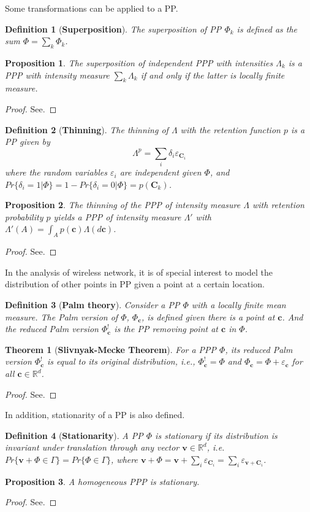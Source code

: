 \documentclass[a4paper,twocolumn]{IEEEtran}
\newtheorem{definition}{\textbf{Definition}}
\newtheorem{proposition}{\textbf{Proposition}}
\newtheorem{theorem}{\textbf{Theorem}}
\begin{document}
Some transformations can be applied to a PP.
\begin{definition}[\textbf{Superposition}]
The superposition of PP $\Phi_k$ is defined as the sum $\Phi=\sum_k \Phi_k$. 	
\end{definition}
\begin{proposition}
The superposition of independent PPP with intensities $\Lambda_k$ is a PPP with intensity measure $\sum_k \Lambda_k$ if and only if the latter is locally finite measure.
\end{proposition}	
\begin{proof}
See.
\end{proof}
\begin{definition}[\textbf{Thinning}]
The thinning of $\Lambda$ with the retention function $p$ is a PP given by
\begin{displaymath}
\Lambda^p = \sum_i \delta_i \varepsilon_{\bm{C}_i} 
\end{displaymath}
where the random variables $\varepsilon_i$ are independent given $\Phi$, and $Pr\{\delta_i=1|\Phi\}=1-Pr\{\delta_i=0|\Phi\}=p(\bm{C}_k)$.
\end{definition}
\begin{proposition}
The thinning of the PPP of intensity measure $\Lambda$ with retention probability $p$ yields a PPP of intensity measure $\Lambda'$ with $\Lambda'(A)=\int_A p(\bm{c}) \Lambda(d\bm{c})$.
\end{proposition}
\begin{proof}
See.
\end{proof}
In the analysis of wireless network, it is of special interest to model the distribution of other points in PP given a point at a certain location.
\begin{definition}[\textbf{Palm theory}]
Consider a PP $\Phi$ with a locally finite mean measure. The Palm version of $\Phi$, $\Phi_{\bm{c}}$, is defined given there is a point at $\bm{c}$. And the reduced Palm version $\Phi_{\bm{c}}^!$ is the PP removing point at $\bm{c}$ in $\Phi$.  
\end{definition}
\begin{theorem}[\textbf{Slivnyak-Mecke Theorem}]
For a PPP $\Phi$, its reduced Palm version $\Phi_{\bm{c}}^!$ is equal to its original distribution, i.e., $\Phi_{\bm{c}}^! = \Phi$ and $\Phi_{\bm{c}} = \Phi+\varepsilon_{\bm{c}}$ for all $\bm{c}\in\mathbb{R}^d$.    
\end{theorem}
\begin{proof}
See.
\end{proof}
In addition, stationarity of a PP is also defined.
\begin{definition}[\textbf{Stationarity}]
A PP $\Phi$ is stationary if its distribution is invariant under translation through any vector $\bm{v}\in\mathbb{R}^d$, i.e. $Pr\{\bm{v}+\Phi \in \Gamma\}=Pr\{\Phi \in \Gamma\}$, where $\bm{v}+\Phi=\bm{v}+\sum_i \varepsilon_{\bm{C}_i} = \sum_i \varepsilon_{\bm{v}+\bm{C}_i}$.
\end{definition}
\begin{proposition}
A homogeneous PPP is stationary.
\end{proposition}
\begin{proof}
See.
\end{proof}
\end{document}
